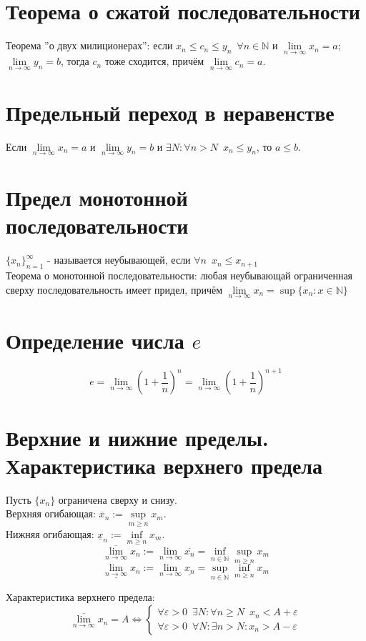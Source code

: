 \documentclass[11pt, a4paper]{article}
\def\N{\mathbb{N}}
\def\sp{\, \, \,}
\def\linf{\lim \limits_{n \to \infty}}
\begin{document}
    \section{Теорема о сжатой последовательности}
    Теорема ''о двух милиционерах'': если $x_n \leq c_n \leq y_n \sp \forall n \in \N$ и $\linf x_n = a$; $\linf y_n = b$, тогда $c_n$ тоже сходится, причём $\linf c_n = a$.

    \section{Предельный переход в неравенстве}
    Если $\linf x_n = a$ и $\linf y_n = b$ и $\exists N: \forall n > N \sp x_n \leq y_n$, то $a \leq b$.
    
    \section{Предел монотонной последовательности}
    $\{x_n\}_{n=1}^{\infty}$ - называется неубывающей, если $\forall n \sp x_n \leq x_{n+1}$\\
    Теорема о монотонной последовательности: любая неубывающай ограниченная сверху последовательность имеет придел, причём $\linf x_n = \sup \{x_n: x \in \N\}$

    \section{Определение числа $e$}
    \[e = \linf \left(1+\frac{1}{n}\right)^n = \linf \left(1+\frac{1}{n}\right)^{n+1}\]

    \section{Верхние и нижние пределы. Характеристика верхнего предела}
    Пусть $\{x_n\}$ ограничена сверху и снизу.\\
    Верхняя огибающая: $\overline{x}_n := \sup \limits_{m \geq n} x_m$.\\
    Нижняя огибающая: $\underline{x}_n := \inf \limits_{m \geq n} x_m$.\\
    \[\overline{\linf} x_n := \linf \overline{x_n} = \inf \limits_{n \in \N} \sup \limits_{m \geq n} x_m\]
    \[\underline{\linf} x_n := \linf \underline{x_n} = \sup \limits_{n \in \N} \inf \limits_{m \geq n} x_m\]

    Характеристика верхнего предела:
    $$\overline{\linf} x_n = A \iff
    \begin{cases}
        \forall \varepsilon > 0 \sp \exists N: \forall n \geq N \sp x_n < A + \varepsilon \\
        \forall \varepsilon > 0 \sp \forall N: \exists n > N: x_n > A - \varepsilon
    \end{cases}$$
\end{document}
